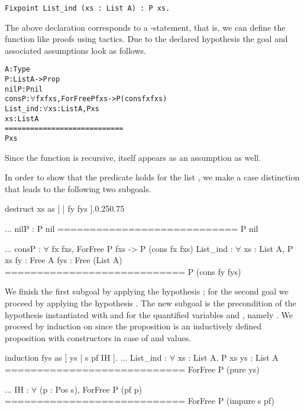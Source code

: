 \begin{verbatim}
Fixpoint List_ind (xs : List A) : P xs.
\end{verbatim}

\noindent%
The above declaration corresponds to a \--statement, that is, we can define the function like proofs using tactics.
Due to the declared hypothesis the goal and associated assumptions look as follows.

\begin{alltt}
  A : Type
  P : List A -> Prop
  nilP : P nil
  consP : \(\forall\) fx fxs, ForFree P fxs -> P (cons fx fxs)
  List_ind : \(\forall\) xs : List A, P xs
  xs : List A
  ============================
  P xs
\end{alltt}

\noindent Since the function is recursive,  itself appears as an assumption as well.

In order to show that the predicate  holds for the list , we make a case distinction that leads to the following two subgoals.

\begin{cproof1}{destruct xs as [ | fy fys ].}{0.25}{0.75}

  ...
  nilP : P nil
  ============================
  P nil

  ...
  consP : \(\forall\) fx fxs, ForFree P fxs -> P (cons fx fxs)
  List_ind : \(\forall\) xs : List A, P xs
  fy : Free A
  fys : Free  (List A)
  ============================
  P (cons fy fys)
\end{cproof1}

\noindent We finish the first subgoal by applying the hypothesis ; for the second goal we proceed by applying the hypothesis .
The new subgoal is the precondition of the hypothesis  instantiated with  and  for the quantified variables  and , namely .
We proceed by induction on  since the proposition  is an inductively defined proposition with constructors in case of  and  values.

\begin{cproof}{induction fys as [ ys | s pf IH ].}
  ...
  List_ind : \(\forall\) xs : List A, P xs
  ys : List A
  ============================
  ForFree P (pure ys)

  ...
  IH : \(\forall\) (p : Pos s), ForFree P (pf p)
  ============================
  ForFree P (impure s pf)
\end{cproof}

